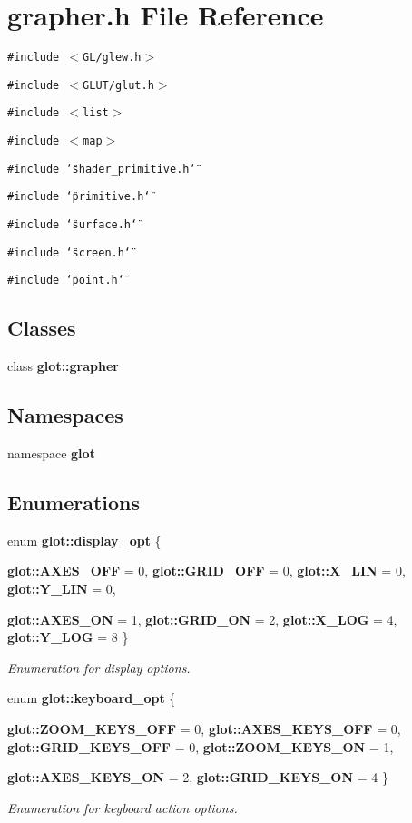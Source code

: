 \section{grapher.h File Reference}
\label{grapher_8h}
{\tt \#include $<$GL/glew.h$>$}\par
{\tt \#include $<$GLUT/glut.h$>$}\par
{\tt \#include $<$list$>$}\par
{\tt \#include $<$map$>$}\par
{\tt \#include \char`\"{}shader\_\-primitive.h\char`\"{}}\par
{\tt \#include \char`\"{}primitive.h\char`\"{}}\par
{\tt \#include \char`\"{}surface.h\char`\"{}}\par
{\tt \#include \char`\"{}screen.h\char`\"{}}\par
{\tt \#include \char`\"{}point.h\char`\"{}}\par
\subsection*{Classes}
\begin{CompactItemize}
\item 
class {\bf glot::grapher}
\end{CompactItemize}
\subsection*{Namespaces}
\begin{CompactItemize}
\item 
namespace {\bf glot}
\end{CompactItemize}
\subsection*{Enumerations}
\begin{CompactItemize}
\item 
enum {\bf glot::display\_\-opt} \{ \par
{\bf glot::AXES\_\-OFF} =  0, 
{\bf glot::GRID\_\-OFF} =  0, 
{\bf glot::X\_\-LIN} =  0, 
{\bf glot::Y\_\-LIN} =  0, 
\par
{\bf glot::AXES\_\-ON} =  1, 
{\bf glot::GRID\_\-ON} =  2, 
{\bf glot::X\_\-LOG} =  4, 
{\bf glot::Y\_\-LOG} =  8
 \}
\begin{CompactList}\small\item\em Enumeration for display options. \item\end{CompactList}\item 
enum {\bf glot::keyboard\_\-opt} \{ \par
{\bf glot::ZOOM\_\-KEYS\_\-OFF} =  0, 
{\bf glot::AXES\_\-KEYS\_\-OFF} =  0, 
{\bf glot::GRID\_\-KEYS\_\-OFF} =  0, 
{\bf glot::ZOOM\_\-KEYS\_\-ON} =  1, 
\par
{\bf glot::AXES\_\-KEYS\_\-ON} =  2, 
{\bf glot::GRID\_\-KEYS\_\-ON} =  4
 \}
\begin{CompactList}\small\item\em Enumeration for keyboard action options. \item\end{CompactList}\end{CompactItemize}
